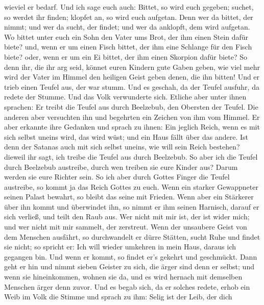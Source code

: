 wieviel er bedarf.  Und ich sage euch auch: Bittet, so wird
euch gegeben; suchet, so werdet ihr finden; klopfet an, so wird euch
aufgetan.  Denn wer da bittet, der nimmt; und wer da sucht,
der findet; und wer da anklopft, dem wird aufgetan.  Wo
bittet unter euch ein Sohn den Vater ums Brot, der ihm einen Stein dafür
biete? und, wenn er um einen Fisch bittet, der ihm eine Schlange für den
Fisch biete?  oder, wenn er um ein Ei bittet, der ihm einen
Skorpion dafür biete?  So denn ihr, die ihr arg seid,
könnet euren Kindern gute Gaben geben, wie viel mehr wird der Vater im
Himmel den heiligen Geist geben denen, die ihn bitten!  Und
er trieb einen Teufel aus, der war stumm. Und es geschah, da der Teufel
ausfuhr, da redete der Stumme. Und das Volk verwunderte sich.
 Etliche aber unter ihnen sprachen: Er treibt die Teufel
aus durch Beelzebub, den Obersten der Teufel.  Die anderen
aber versuchten ihn und begehrten ein Zeichen von ihm vom Himmel.
 Er aber erkannte ihre Gedanken und sprach zu ihnen: Ein
jeglich Reich, wenn es mit sich selbst uneins wird, das wird wüst; und
ein Haus fällt über das andere.  Ist denn der Satanas auch
mit sich selbst uneins, wie will sein Reich bestehen? dieweil ihr sagt,
ich treibe die Teufel aus durch Beelzebub.  So aber ich die
Teufel durch Beelzebub austreibe, durch wen treiben sie eure Kinder aus?
Darum werden sie eure Richter sein.  So ich aber durch
Gottes Finger die Teufel austreibe, so kommt ja das Reich Gottes zu
euch.  Wenn ein starker Gewappneter seinen Palast bewahrt,
so bleibt das seine mit Frieden.  Wenn aber ein Stärkerer
über ihn kommt und überwindet ihn, so nimmt er ihm seinen Harnisch,
darauf er sich verließ, und teilt den Raub aus.  Wer nicht
mit mir ist, der ist wider mich; und wer nicht mit mir sammelt, der
zerstreut.  Wenn der unsaubere Geist von dem Menschen
ausfährt, so durchwandelt er dürre Stätten, sucht Ruhe und findet sie
nicht; so spricht er: Ich will wieder umkehren in mein Haus, daraus ich
gegangen bin.  Und wenn er kommt, so findet er's gekehrt
und geschmückt.  Dann geht er hin und nimmt sieben Geister
zu sich, die ärger sind denn er selbst; und wenn sie hineinkommen,
wohnen sie da, und es wird hernach mit demselben Menschen ärger denn
zuvor.  Und es begab sich, da er solches redete, erhob ein
Weib im Volk die Stimme und sprach zu ihm: Selig ist der Leib, der dich
